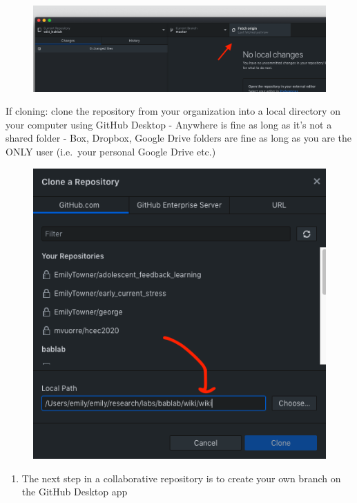 \documentclass[]{book}
\providecommand{\tightlist}{%
  \setlength{\itemsep}{0pt}\setlength{\parskip}{0pt}}
\begin{document}
\begin{figure}
\centering
\includegraphics{images/research_protocols/github/30.png}
\caption{}
\end{figure}

If cloning: clone the repository from your organization into a local
directory on your computer using GitHub Desktop - Anywhere is fine as
long as it's not a shared folder - Box, Dropbox, Google Drive folders
are fine as long as you are the ONLY user (i.e.~your personal Google
Drive etc.)

\begin{figure}
\centering
\includegraphics{images/research_protocols/github/22.png}
\caption{}
\end{figure}

\begin{enumerate}
\def\labelenumi{\arabic{enumi}.}
\setcounter{enumi}{1}
\tightlist
\item
  The next step in a collaborative repository is to create your own
  branch on the GitHub Desktop app\\
\end{enumerate}
\end{document}
